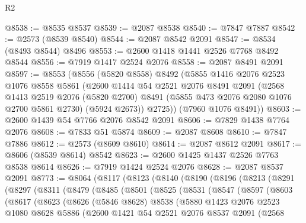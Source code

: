 \begin{lexlean}{R2}
\begin{coremodule}
@8538 := @8535 @8537
@8539 := @2087 @8538
@8540 := @7847 @7887
@8542 := @2573 (@8539 @8540)
@8544 := @2087 @8542 @2091
@8547 := @8534 (@8493 @8544) @8496
@8553 := @2600 @1418 @1441 @2526 @7768 @8492 @8544
@8556 := @7919 @1417 @2524 @2076
@8558 := @2087 @8491 @2091
@8597 := @8553
    (@8556
      (@5820 @8558)
      @8492
      (@5855
        @1416
        @2076
        @2523
        @1076
        @8558
        @5861
        (@2600
          @1414
          @54
          @2521
          @2076
          @8491
          @2091
          (@2568
            @1413
            @2519
            @2076
            (@5820 @2700)
            @8491
            (@5855 @473 @2076 @2080 @1076 @2700 @5861 @2730)
            (@5924 @2673))
          @2725))
      (@7960 @1076 @8491))
@8603 := @2600 @1439 @54 @7766 @2076 @8542 @2091
@8606 := @7829 @1438 @7764 @2076
@8608 := @7833 @51 @5874
@8609 := @2087 @8608
@8610 := @7847 @7886
@8612 := @2573 (@8609 @8610)
@8614 := @2087 @8612 @2091
@8617 := @8606 (@8539 @8614) @8542
@8623 := @2600 @1425 @1437 @2526 @7763 @8538 @8614
@8626 := @7919 @1424 @2524 @2076
@8628 := @2087 @8537 @2091
@8773 := @8064
    (@8117
      (@8123
        (@8140
          (@8190
            (@8196
              (@8213
                (@8291
                  (@8297
                    (@8311
                      (@8479
                        (@8485
                          (@8501
                            (@8525
                              (@8531
                                (@8547
                                  (@8597
                                    (@8603
                                      (@8617
                                        (@8623
                                          (@8626
                                            (@5846 @8628)
                                            @8538
                                            (@5880
                                              @1423
                                              @2076
                                              @2523
                                              @1080
                                              @8628
                                              @5886
                                              (@2600
                                                @1421
                                                @54
                                                @2521
                                                @2076
                                                @8537
                                                @2091
                                                (@2568

\end{coremodule}
\end{lexlean}
